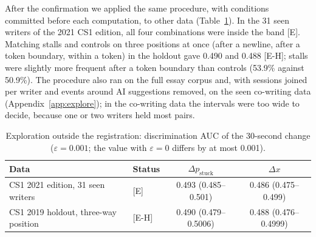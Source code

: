 After the confirmation we applied the same procedure, with conditions committed before each computation, to other data
(Table~\ref{tab:explore}). In the 31 seen writers of the 2021 CS1 edition, all four combinations were inside the band
[E]. Matching stalls and controls on three positions at once (after a newline, after a token boundary, within a token)
in the holdout gave 0.490 and 0.488 [E-H]; stalls were slightly more frequent after a token boundary than controls (53.9\%
against 50.9\%). The procedure also ran on the full essay corpus and, with sessions joined per writer and events around AI suggestions
removed, on the seen co-writing data (Appendix~\ref{app:explore}); in the co-writing data the intervals were too wide to decide, because one or two writers
held most pairs.

\begin{table}
  \caption{Exploration outside the registration: discrimination AUC of the 30-second change ($\varepsilon = 0.001$; the
  value with $\varepsilon = 0$ differs by at most 0.001).}
  \label{tab:explore}
  \centering\small
  \begin{tabularx}{\linewidth}{>{\raggedright\arraybackslash}X l c c}
    \toprule
    Data & Status & $\Delta p_{\mathrm{stuck}}$ & $\Delta x$ \\
    \midrule
    CS1 2021 edition, 31 seen writers & [E] & 0.493 (0.485--0.501) & 0.486 (0.475--0.499) \\
    CS1 2019 holdout, three-way position & [E-H] & 0.490 (0.479--0.5006) & 0.488 (0.476--0.4999) \\
    \bottomrule
  \end{tabularx}
\end{table}

